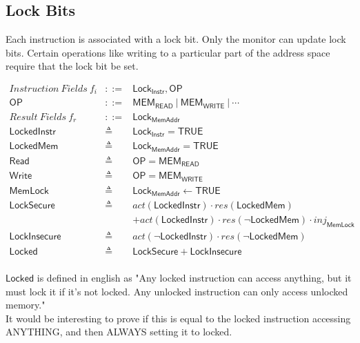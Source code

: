 \documentclass[12pt, letterpaper]{article}
\begin{document}

\subsection{Lock Bits}
 Each instruction is associated with a lock bit.
 Only the monitor can update lock bits.
 Certain operations like writing to a particular part of the address space
 require that the lock bit be set. 

 \[
 \begin{array}{rcl}
   \mathit{Instruction\ Fields}\ f_i &::=& \mathsf{Lock_{Instr}}, \mathsf{OP}\\
   \mathsf{OP} &::=& \mathsf{MEM_{READ}}\ |\ \mathsf{MEM_{WRITE}}\ |\ \cdots \\
   \mathit{Result\ Fields}\ f_r &::=& \mathsf{Lock_{MemAddr}}\\
   \mathsf{LockedInstr} &\triangleq& \mathsf{Lock_{Instr}} = \mathsf{TRUE} \\
   \mathsf{LockedMem} &\triangleq& \mathsf{Lock_{MemAddr}} = \mathsf{TRUE} \\
   \mathsf{Read} &\triangleq& \mathsf{OP} = \mathsf{MEM_{READ}}\\
   \mathsf{Write} &\triangleq& \mathsf{OP} = \mathsf{MEM_{WRITE}}\\
   \mathsf{MemLock} &\triangleq& \mathsf{Lock_{MemAddr}} \leftarrow \mathsf{TRUE}\\ 
   \mathsf{LockSecure} &\triangleq& 
     act(\mathsf{LockedInstr})\cdot res(\mathsf{LockedMem})\\
     &&+
     act(\mathsf{LockedInstr})\cdot res(\neg \mathsf{LockedMem}) \cdot \mathit{inj_{\mathsf{MemLock}}} \\
   \mathsf{LockInsecure} &\triangleq&
      act(\neg \mathsf{LockedInstr})\cdot res(\neg \mathsf{LockedMem})\\
   \mathsf{Locked} &\triangleq& \mathsf{LockSecure} + \mathsf{LockInsecure}
 \end{array}
 \]\\
 $\mathsf{Locked}$ is defined in english as "Any locked instruction can access anything, but it must lock it if it's not locked.  Any unlocked instruction can only access unlocked memory."\\
 It would be interesting to prove if this is equal to the locked instruction accessing ANYTHING, and then ALWAYS setting it to locked.
\end{document}
